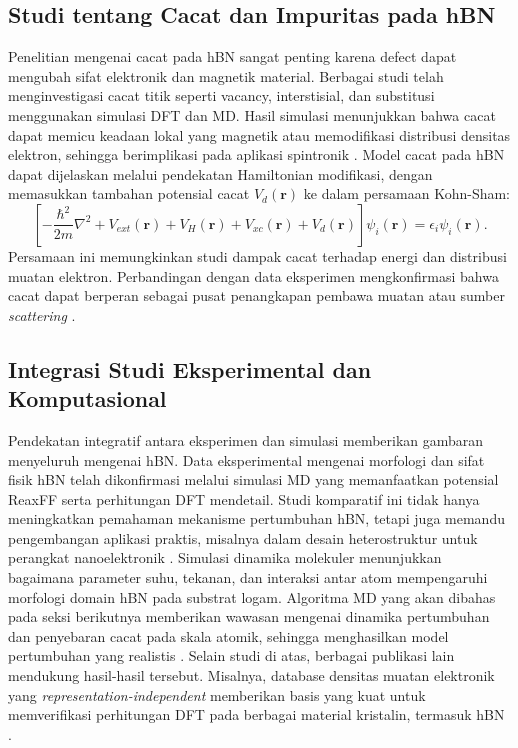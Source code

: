 \subsection{Studi tentang Cacat dan Impuritas pada hBN}
Penelitian mengenai cacat pada hBN sangat penting karena defect dapat mengubah sifat elektronik dan magnetik material.
Berbagai studi telah menginvestigasi cacat titik seperti vacancy, interstisial, dan substitusi menggunakan simulasi DFT dan MD.
Hasil simulasi menunjukkan bahwa cacat dapat memicu keadaan lokal yang magnetik atau memodifikasi distribusi densitas elektron, sehingga berimplikasi pada aplikasi spintronik \citep{Zhang2020}.
Model cacat pada hBN dapat dijelaskan melalui pendekatan Hamiltonian modifikasi, dengan memasukkan tambahan potensial cacat \(V_d(\mathbf{r})\) ke dalam persamaan Kohn-Sham:
\begin{equation}
    \left[-\frac{\hbar^2}{2m}\nabla^2 + V_{ext}(\mathbf{r}) + V_H(\mathbf{r}) + V_{xc}(\mathbf{r}) + V_d(\mathbf{r})\right]\psi_i(\mathbf{r}) = \epsilon_i \psi_i(\mathbf{r}).
\end{equation}
Persamaan ini memungkinkan studi dampak cacat terhadap energi dan distribusi muatan elektron.
Perbandingan dengan data eksperimen mengkonfirmasi bahwa cacat dapat berperan sebagai pusat penangkapan pembawa muatan atau sumber \emph{scattering} \citep{Zhang2020}.

\subsection{Integrasi Studi Eksperimental dan Komputasional}
Pendekatan integratif antara eksperimen dan simulasi memberikan gambaran menyeluruh mengenai hBN.
Data eksperimental mengenai morfologi dan sifat fisik hBN telah dikonfirmasi melalui simulasi MD yang memanfaatkan potensial ReaxFF serta perhitungan DFT mendetail.
Studi komparatif ini tidak hanya meningkatkan pemahaman mekanisme pertumbuhan hBN, tetapi juga memandu pengembangan aplikasi praktis, misalnya dalam desain heterostruktur untuk perangkat nanoelektronik \citep{Lele2022}.
Simulasi dinamika molekuler menunjukkan bagaimana parameter suhu, tekanan, dan interaksi antar atom mempengaruhi morfologi domain hBN pada substrat logam.
Algoritma MD yang akan dibahas pada seksi berikutnya memberikan wawasan mengenai dinamika pertumbuhan dan penyebaran cacat pada skala atomik, sehingga menghasilkan model pertumbuhan yang realistis \citep{Lele2022}.
Selain studi di atas, berbagai publikasi lain mendukung hasil-hasil tersebut.
Misalnya, database densitas muatan elektronik yang \emph{representation-independent} memberikan basis yang kuat untuk memverifikasi perhitungan DFT pada berbagai material kristalin, termasuk hBN \citep{Shen2022}.

